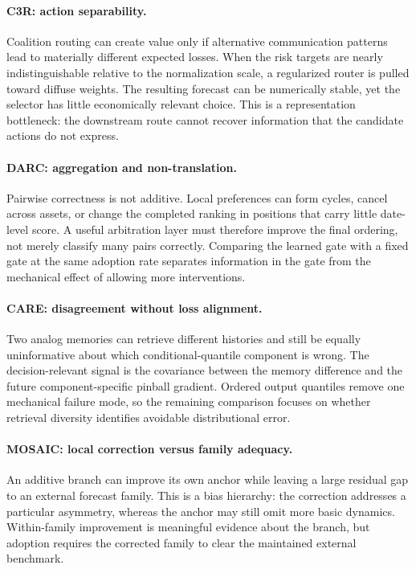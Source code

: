 \documentclass[10pt]{article}
\begin{document}
\paragraph{C3R: action separability.}
Coalition routing can create value only if alternative communication patterns
lead to materially different expected losses. When the risk targets are nearly
indistinguishable relative to the normalization scale, a regularized router is
pulled toward diffuse weights. The resulting forecast can be numerically
stable, yet the selector has little economically relevant choice. This is a
representation bottleneck: the downstream route cannot recover information
that the candidate actions do not express.

\paragraph{DARC: aggregation and non-translation.}
Pairwise correctness is not additive. Local preferences can form cycles,
cancel across assets, or change the completed ranking in positions that carry
little date-level score. A useful arbitration layer must therefore improve the
final ordering, not merely classify many pairs correctly. Comparing the learned
gate with a fixed gate at the same adoption rate separates information in the
gate from the mechanical effect of allowing more interventions.

\paragraph{CARE: disagreement without loss alignment.}
Two analog memories can retrieve different histories and still be equally
uninformative about which conditional-quantile component is wrong. The
decision-relevant signal is the covariance between the memory difference and
the future component-specific pinball gradient. Ordered output quantiles remove
one mechanical failure mode, so the remaining comparison focuses on whether
retrieval diversity identifies avoidable distributional error.

\paragraph{MOSAIC: local correction versus family adequacy.}
An additive branch can improve its own anchor while leaving a large residual
gap to an external forecast family. This is a bias hierarchy: the correction
addresses a particular asymmetry, whereas the anchor may still omit more basic
dynamics. Within-family improvement is meaningful evidence about the branch,
but adoption requires the corrected family to clear the maintained external
benchmark.
\end{document}
